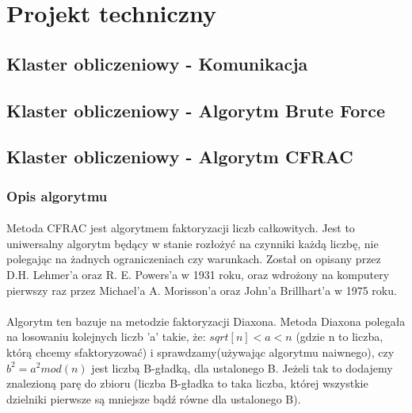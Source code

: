 \documentclass{article}
\begin{document}




\section{Projekt techniczny}

\subsection{Klaster obliczeniowy - Komunikacja}


\subsection{Klaster obliczeniowy - Algorytm Brute Force}

\subsection{Klaster obliczeniowy - Algorytm CFRAC}
\subsubsection{Opis algorytmu\cite{cfracwiki}\cite{cfracinz}}
\paragraph{}Metoda CFRAC  jest algorytmem faktoryzacji liczb całkowitych. Jest to uniwersalny algorytm będący w stanie rozłożyć na czynniki każdą liczbę, nie polegając na żadnych ograniczeniach czy warunkach. Został on opisany przez D.H. Lehmer'a oraz R. E. Powers'a w 1931 roku, oraz wdrożony na komputery pierwszy raz przez Michael'a A. Morisson'a oraz John'a Brillhart'a w 1975 roku.

\paragraph{}Algorytm ten bazuje na metodzie faktoryzacji Diaxona. Metoda Diaxona polegała na losowaniu kolejnych liczb 'a' takie, że:
$sqrt[n] < a < n$ (gdzie n to liczba, którą chcemy sfaktoryzować)
i sprawdzamy(używając algorytmu naiwnego), czy $b^2 = a^2mod(n)$ jest liczbą B-gładką, dla ustalonego B. Jeżeli tak to dodajemy znalezioną parę do zbioru (liczba B-gładka to taka liczba, której wszystkie dzielniki pierwsze są mniejsze bądź równe dla ustalonego B).
\end{document}
